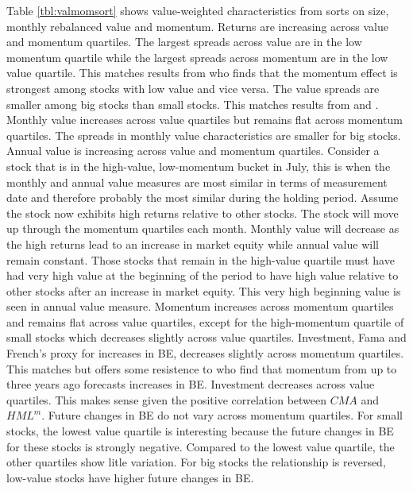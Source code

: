 Table \ref{tbl:valmomsort} shows value-weighted characteristics from sorts on size,
monthly rebalanced value and momentum. Returns are increasing across value and momentum
quartiles. The largest spreads across value are in the low momentum quartile while the
largest spreads across momentum are in the low value quartile. This matches results from
\textcite{asness1997interaction} who finds that the momentum effect is strongest among
stocks with low value and vice versa. The value spreads are smaller among big stocks than
small stocks. This matches results from \textcite{asness2015fact} and
\textcite{kok2017facts}. Monthly value increases across value quartiles but remains flat
across momentum quartiles. The spreads in monthly value characteristics are smaller for
big stocks. Annual value is increasing across value and momentum quartiles. Consider a
stock that is in the high-value, low-momentum bucket in July, this is when the monthly and
annual value measures are most similar in terms of measurement date and therefore probably
the most similar during the holding period. Assume the stock now exhibits high returns
relative to other stocks. The stock will move up through the momentum quartiles each
month. Monthly value will decrease as the high returns lead to an increase in market
equity while annual value will remain constant. Those stocks that remain in the high-value
quartile must have had very high value at the beginning of the period to have high value
relative to other stocks after an increase in market equity. This very high beginning
value is seen in annual value measure. Momentum increases across momentum quartiles and
remains flat across value quartiles, except for the high-momentum quartile of small stocks
which decreases slightly across value quartiles. Investment, Fama and French's proxy for
increases in BE, decreases slightly across momentum quartiles. This matches
\textcite{fama2016dissecting} but offers some resistence to \textcite{asness2013devil} who
find that momentum from up to three years ago forecasts increases in BE. Investment
decreases across value quartiles. This makes sense given the positive correlation between
$CMA$ and $HML^m$. Future changes in BE do not vary across momentum quartiles. For small
stocks, the lowest value quartile is interesting because the future changes in BE for
these stocks is strongly negative. Compared to the lowest value quartile, the other
quartiles show litle variation. For big stocks the relationship is reversed, low-value
stocks have higher future changes in BE.

